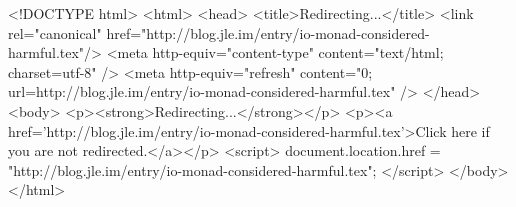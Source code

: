 <!DOCTYPE html>
<html>
<head>
<title>Redirecting...</title>
<link rel="canonical" href="http://blog.jle.im/entry/io-monad-considered-harmful.tex"/>
<meta http-equiv="content-type" content="text/html; charset=utf-8" />
<meta http-equiv="refresh" content="0; url=http://blog.jle.im/entry/io-monad-considered-harmful.tex" />
</head>
<body>
  <p><strong>Redirecting...</strong></p>
  <p><a href='http://blog.jle.im/entry/io-monad-considered-harmful.tex'>Click here if you are not redirected.</a></p>
  <script>
    document.location.href = "http://blog.jle.im/entry/io-monad-considered-harmful.tex";
  </script>
</body>
</html>
